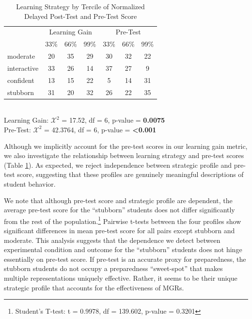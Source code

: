 \documentclass{edm_template}
\begin{document}
\begin{table}[hbtp]
\centering
\begin{tabular}{|l || c | c | c | c | c | c |}
\hline
& \multicolumn{3}{c|}{Learning Gain} & \multicolumn{3}{c|}{Pre-Test} \\ \cline{2-7}
&33\%&66\%&99\%&33\%&66\%&99\%\\ \hline \hline
  moderate   &   20& 35& 29 & 30 & 32 & 22 \\ \hline
  interactive &   33& 26& 14 & 37 & 27 & 9\\ \hline
confident & 13& 15& 22 &5 & 14 & 31\\ \hline
  stubborn & 31& 20& 32 & 26 & 22 & 35 \\ \hline
 \end{tabular} \\
Learning Gain: $\mathcal{X}^2$ = 17.52, df = 6, p-value = {\bf 0.0075} \\
Pre-Test: $\mathcal{X}^{2}$ = 42.3764, df = 6, p-value = {\bf <0.001}
\caption{Learning Strategy by Tercile of Normalized Delayed Post-Test and Pre-Test Score}
\label{tab:LS-by-score}
\end{table}

Although we implicitly account for the pre-test scores in our learning gain metric, we also investigate the relationship between learning strategy and pre-test scores (Table \ref{tab:LS-by-score}). As expected, we reject independence between strategic profile and pre-test score, suggesting that these profiles are genuinely meaningful descriptions of student behavior.

We note that although pre-test score and strategic profile are dependent, the average pre-test score for the ``stubborn'' students does not differ significantly from the rest of the population.\footnote{Student's T-test: t = 0.9978, df = 139.602, p-value = 0.3201} Pairwise t-tests between the four profiles show significant differences in mean pre-test score for all pairs except stubborn and moderate. This analysis suggests that the dependence we detect between experimental condition and outcome for the ``stubborn'' students does not hinge essentially on pre-test score. If pre-test is an accurate proxy for preparedness, the stubborn students do not occupy a preparedness ``sweet-spot'' that makes multiple representations uniquely effective. Rather, it seems to be their unique strategic profile that accounts for the effectiveness of MGRs.

\end{document}
